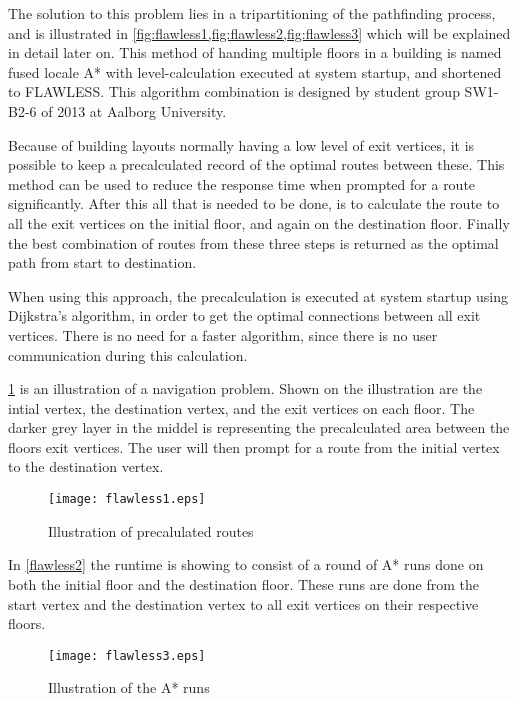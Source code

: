 The solution to this problem lies in a tripartitioning of the pathfinding process, and is illustrated in \cref{fig:flawless1,fig:flawless2,fig:flawless3} which will be explained in detail later on. This method of handing multiple floors in a building is named fused locale A* with level-calculation executed at system startup, and shortened to FLAWLESS. This algorithm combination is designed by student group SW1-B2-6 of 2013 at Aalborg University.

Because of building layouts normally having a low level of exit vertices, it is possible to keep a precalculated record of the optimal routes between these. This method can be used to reduce the response time when prompted for a route significantly.
After this all that is needed to be done, is to calculate the route to all the exit vertices on the initial floor, and again on the destination floor. Finally the best combination of routes from these three steps is returned as the optimal path from start to destination.

When using this approach, the precalculation is executed at system startup using Dijkstra's algorithm, in order to get the optimal connections between all exit vertices. There is no need for a faster algorithm, since there is no user communication during this calculation.

\cref{fig:flawless1} is an illustration of a navigation problem. Shown on the illustration are the intial vertex, the destination vertex, and the exit vertices on each floor. The darker grey layer in the middel is representing the precalculated area between the floors exit vertices. The user will then prompt for a route from the initial vertex to the destination vertex.

\begin{figure}[ht!]
    \centering
    \texttt{[image: flawless1.eps]}
    \caption{Illustration of precalulated routes}
    \label{fig:flawless1}
  \end{figure}

In \cref{flawless2} the runtime is showing to consist of a round of A* runs done on both the initial floor and the destination floor. These runs are done from the start vertex and the destination vertex to all exit vertices on their respective floors.

\begin{figure}[ht!]
    \centering
    \texttt{[image: flawless3.eps]}
    \caption{Illustration of the A* runs}
    \label{fig:flawless2}
  \end{figure}

